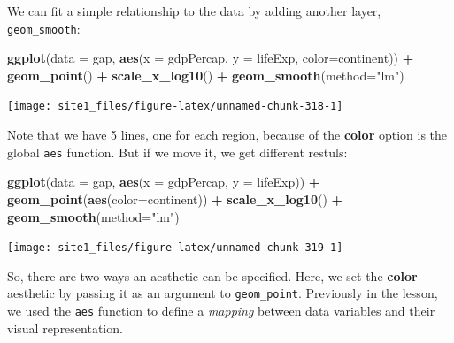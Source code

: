 \documentclass[]{book}
\newenvironment{Shaded}{\begin{snugshade}}{\end{snugshade}}
\newcommand{\KeywordTok}[1]{\textcolor[rgb]{0.13,0.29,0.53}{\textbf{#1}}}
\newcommand{\DataTypeTok}[1]{\textcolor[rgb]{0.13,0.29,0.53}{#1}}
\newcommand{\StringTok}[1]{\textcolor[rgb]{0.31,0.60,0.02}{#1}}
\newcommand{\OperatorTok}[1]{\textcolor[rgb]{0.81,0.36,0.00}{\textbf{#1}}}
\newcommand{\NormalTok}[1]{#1}
\begin{document}
We can fit a simple relationship to the data by adding another layer,
\texttt{geom\_smooth}:

\begin{Shaded}
\begin{Highlighting}[]
\KeywordTok{ggplot}\NormalTok{(}\DataTypeTok{data =}\NormalTok{ gap, }\KeywordTok{aes}\NormalTok{(}\DataTypeTok{x =}\NormalTok{ gdpPercap, }\DataTypeTok{y =}\NormalTok{ lifeExp, }\DataTypeTok{color=}\NormalTok{continent)) }\OperatorTok{+}\StringTok{ }
\StringTok{  }\KeywordTok{geom_point}\NormalTok{() }\OperatorTok{+}\StringTok{ }
\StringTok{  }\KeywordTok{scale_x_log10}\NormalTok{() }\OperatorTok{+}\StringTok{ }
\StringTok{  }\KeywordTok{geom_smooth}\NormalTok{(}\DataTypeTok{method=}\StringTok{"lm"}\NormalTok{)}
\end{Highlighting}
\end{Shaded}

\begin{center}\texttt{[image: site1\_files/figure-latex/unnamed-chunk-318-1]} \end{center}

Note that we have 5 lines, one for each region, because of the
\textbf{color} option is the global \texttt{aes} function. But if we
move it, we get different restuls:

\begin{Shaded}
\begin{Highlighting}[]
\KeywordTok{ggplot}\NormalTok{(}\DataTypeTok{data =}\NormalTok{ gap, }\KeywordTok{aes}\NormalTok{(}\DataTypeTok{x =}\NormalTok{ gdpPercap, }\DataTypeTok{y =}\NormalTok{ lifeExp)) }\OperatorTok{+}\StringTok{ }
\StringTok{  }\KeywordTok{geom_point}\NormalTok{(}\KeywordTok{aes}\NormalTok{(}\DataTypeTok{color=}\NormalTok{continent)) }\OperatorTok{+}\StringTok{ }
\StringTok{  }\KeywordTok{scale_x_log10}\NormalTok{() }\OperatorTok{+}\StringTok{ }
\StringTok{  }\KeywordTok{geom_smooth}\NormalTok{(}\DataTypeTok{method=}\StringTok{"lm"}\NormalTok{)}
\end{Highlighting}
\end{Shaded}

\begin{center}\texttt{[image: site1\_files/figure-latex/unnamed-chunk-319-1]} \end{center}

So, there are two ways an aesthetic can be specified. Here, we set the
\textbf{color} aesthetic by passing it as an argument to
\texttt{geom\_point}. Previously in the lesson, we used the \texttt{aes}
function to define a \emph{mapping} between data variables and their
visual representation.
\end{document}
